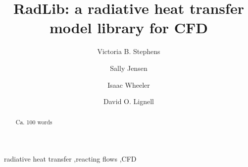 \documentclass[preprint,12pt, a4paper]{elsarticle}
\begin{document}
\begin{frontmatter}



\title{RadLib: a radiative heat transfer model library for CFD}


\author{Victoria B. Stephens}
\author{Sally Jensen}
\author{Isaac Wheeler}
\author{David O. Lignell}


\address{Department of Chemical Engineering, Brigham Young University, Provo, UT 84602, United States}

\begin{abstract}
Ca. 100 words
\end{abstract}

\begin{keyword}
radiative heat transfer \sep reacting flows  \sep CFD
\end{keyword}

\end{frontmatter}
\end{document}
